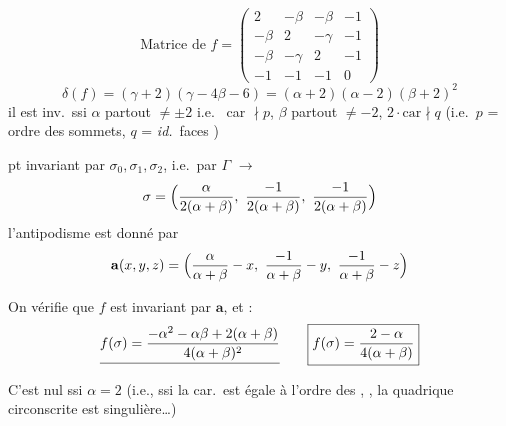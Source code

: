 \documentclass[11pt,a4paper]{article}
\begin{document}
\[
\text{Matrice de } f = \begin{pmatrix}
2 & -\beta & -\beta & -1 \\
-\beta & 2 & -\gamma & -1 \\
-\beta & -\gamma & 2 & -1 \\
-1 & -1 & -1 & 0
\end{pmatrix}
\]
\[
\delta(f) = (\gamma+2)(\gamma - 4\beta - 6) = (\alpha+2)(\alpha-2)(\beta+2)^2
\]
il est  inv.\ ssi $\alpha$ partout $\neq \pm 2$ i.e.\ \struck{\ill{}} car $\nmid p$, $\beta$ partout $\neq -2$, $2\cdot\text{car} \nmid q$
(i.e.\ $p$ = ordre des sommets, $q$ = \textit{id.}\ faces )


 pt invariant par $\sigma_0, \sigma_1, \sigma_2$, i.e.\ par $\Gamma$ $\longrightarrow$
\[
\sigma = \Bigl(\frac{\alpha}{2(\alpha+\beta)},\ \frac{-1}{2(\alpha+\beta)},\ \frac{-1}{2(\alpha+\beta)}\Bigr)
\]
l'antipodisme est donné par
\[
\mathbf{a}(x,y,z) = \Bigl(\frac{\alpha}{\alpha+\beta} - x,\ \frac{-1}{\alpha+\beta} - y,\ \frac{-1}{\alpha+\beta} - z\Bigr)
\]

On vérifie que $f$ est invariant par $\mathbf{a}$, et \ill{} :
\[
\struck{f(\sigma) = \frac{-\alpha^2 - \alpha\beta + 2(\alpha+\beta)}{4(\alpha+\beta)^2}}
\qquad
\boxed{f(\sigma) = \frac{2-\alpha}{4(\alpha+\beta)}}
\]
C'est nul ssi $\alpha = 2$ (i.e.,  ssi la car.\ est égale à \struck{\ill{}} l'ordre \struck{\ill{}} des \struck{\ill{}} \ill{}, , la quadrique circonscrite est singulière\ldots)
\end{document}
